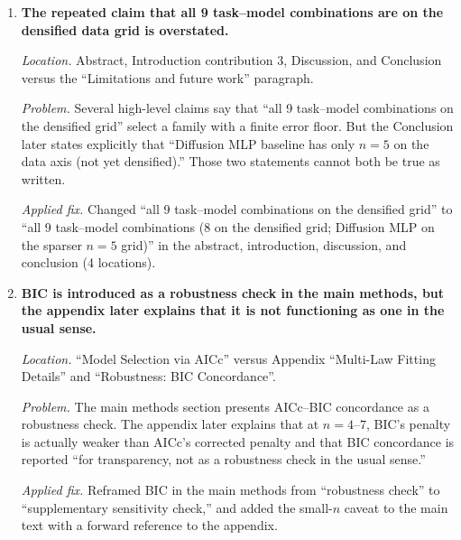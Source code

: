 \documentclass[11pt]{article}
\begin{document}
\begin{enumerate}
\emph{Applied fixes.}
\begin{itemize}
  \item Changed Diffusion FNO from ``linear'' to ``logarithmic'' in the main resolution table.
  \item Changed ``linear/linear'' to ``logarithmic/power'' in the restricted comparison table.
  \item Changed footer ``Robust: 5/27'' to ``4/27'' and ``Exploratory: 15/27'' to ``16/27.''
  \item Changed ``4 of 5 robust cases'' to ``3 of 4'' in three locations.
\end{itemize}

\item \textbf{The repeated claim that all 9 task--model combinations are on the densified data grid is overstated.}

\emph{Location.} Abstract, Introduction contribution 3, Discussion, and Conclusion versus the ``Limitations and future work'' paragraph.

\emph{Problem.} Several high-level claims say that ``all 9 task--model combinations on the densified grid'' select a family with a finite error floor. But the Conclusion later states explicitly that ``Diffusion MLP baseline has only $n=5$ on the data axis (not yet densified).'' Those two statements cannot both be true as written.

\emph{Applied fix.} Changed ``all 9 task--model combinations on the densified grid'' to ``all 9 task--model combinations (8 on the densified grid; Diffusion MLP on the sparser $n=5$ grid)'' in the abstract, introduction, discussion, and conclusion (4 locations).

\item \textbf{BIC is introduced as a robustness check in the main methods, but the appendix later explains that it is not functioning as one in the usual sense.}

\emph{Location.} ``Model Selection via AICc'' versus Appendix ``Multi-Law Fitting Details'' and ``Robustness: BIC Concordance''.

\emph{Problem.} The main methods section presents AICc--BIC concordance as a robustness check. The appendix later explains that at $n=4$--$7$, BIC's penalty is actually weaker than AICc's corrected penalty and that BIC concordance is reported ``for transparency, not as a robustness check in the usual sense.''

\emph{Applied fix.} Reframed BIC in the main methods from ``robustness check'' to ``supplementary sensitivity check,'' and added the small-$n$ caveat to the main text with a forward reference to the appendix.
\end{enumerate}
\end{document}
